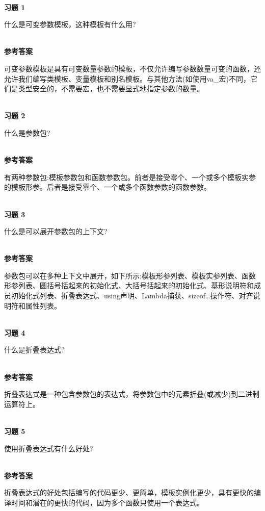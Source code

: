 \hspace*{\fill} \\ %
\noindent
\textbf{习题 1}

什么是可变参数模板，这种模板有什么用?

\hspace*{\fill} \\ %
\noindent
\textbf{参考答案}

可变参数模板是具有可变数量参数的模板，不仅允许编写参数数量可变的函数，还允许我们编写类模板、变量模板和别名模板。与其他方法(如使用va\_宏)不同，它们是类型安全的，不需要宏，也不需要显式地指定参数的数量。


\hspace*{\fill} \\ %
\noindent
\textbf{习题 2}

什么是参数包?

\hspace*{\fill} \\ %
\noindent
\textbf{参考答案}

有两种参数包:模板参数包和函数参数包。前者是接受零个、一个或多个模板实参的模板形参。后者是接受零个、一个或多个函数参数的函数参数。

\hspace*{\fill} \\ %
\noindent
\textbf{习题 3}

什么是可以展开参数包的上下文?

\hspace*{\fill} \\ %
\noindent
\textbf{参考答案}

参数包可以在多种上下文中展开，如下所示:模板形参列表、模板实参列表、函数形参列表、圆括号括起来的初始化式、大括号括起来的初始化式、基形说明符和成员初始化式列表、折叠表达式、using声明、Lambda捕获、sizeof…操作符、对齐说明符和属性列表。

\hspace*{\fill} \\ %
\noindent
\textbf{习题 4}

什么是折叠表达式?

\hspace*{\fill} \\ %
\noindent
\textbf{参考答案}

折叠表达式是一种包含参数包的表达式，将参数包中的元素折叠(或减少)到二进制运算符上。

\hspace*{\fill} \\ %
\noindent
\textbf{习题 5}

使用折叠表达式有什么好处?

\hspace*{\fill} \\ %
\noindent
\textbf{参考答案}

折叠表达式的好处包括编写的代码更少、更简单，模板实例化更少，具有更快的编译时间和潜在的更快的代码，因为多个函数只使用一个表达式。












